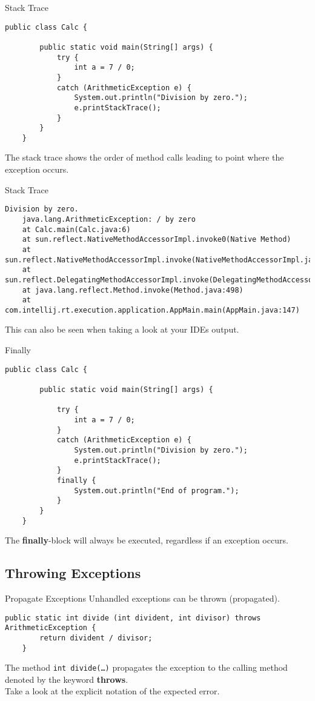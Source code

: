 \begin{frame}[fragile]{Stack Trace}
	\begin{lstlisting}[basicstyle=\ttfamily\scriptsize]
	public class Calc {
	
		public static void main(String[] args) {
			try {
				int a = 7 / 0;
			} 
			catch (ArithmeticException e) {
				System.out.println("Division by zero.");
				e.printStackTrace();
			}
		}
	}
	\end{lstlisting}
	The stack trace shows the order of method calls leading to point where the exception occurs.
\end{frame}

\begin{frame}[fragile]{Stack Trace}
	\begin{lstlisting}[basicstyle=\ttfamily\scriptsize]
	Division by zero.
	java.lang.ArithmeticException: / by zero
	at Calc.main(Calc.java:6)
	at sun.reflect.NativeMethodAccessorImpl.invoke0(Native Method)
	at sun.reflect.NativeMethodAccessorImpl.invoke(NativeMethodAccessorImpl.java:62)
	at sun.reflect.DelegatingMethodAccessorImpl.invoke(DelegatingMethodAccessorImpl.java:43)
	at java.lang.reflect.Method.invoke(Method.java:498)
	at com.intellij.rt.execution.application.AppMain.main(AppMain.java:147)
	\end{lstlisting}
	This can also be seen when taking a look at your IDEs output.
\end{frame}

\begin{frame}[fragile]{Finally}
	\begin{lstlisting}[basicstyle=\ttfamily\scriptsize]
	public class Calc {
	
		public static void main(String[] args) {
		
			try {
				int a = 7 / 0;
			} 
			catch (ArithmeticException e) {
				System.out.println("Division by zero.");
				e.printStackTrace();
			} 
			finally {
				System.out.println("End of program.");
			}
		}
	}
	\end{lstlisting}
	The \textbf{finally}-block will always be executed, regardless if an exception occurs.
\end{frame}

\subsection{Throwing Exceptions}
\begin{frame}[fragile]{Propagate Exceptions}
	Unhandled exceptions can be thrown (propagated).
	\begin{lstlisting}[basicstyle=\ttfamily\scriptsize]	
	public static int divide (int divident, int divisor) throws ArithmeticException {
		return divident / divisor;
	}
	\end{lstlisting}
	The method \texttt{int divide(\dots)} propagates the exception to the calling
	method denoted by the keyword \textbf{throws}.\\
	Take a look at the explicit notation of the expected error.
\end{frame}

